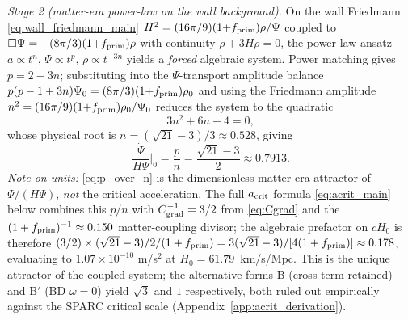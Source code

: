 \documentclass[aps,prd,twocolumn,nofootinbib,floatfix,superscriptaddress]{revtex4-2}
\begin{document}
\emph{Stage 2 (matter-era power-law on the wall background).} On the
wall Friedmann \eqref{eq:wall_friedmann_main}
$H^2 = (16\pi/9)(1{+}f_{\rm prim})\rho/\Psi$ coupled to
$\Box\Psi = -(8\pi/3)(1{+}f_{\rm prim})\rho$ with continuity
$\dot\rho + 3H\rho = 0$, the power-law ansatz
$a\propto t^n$, $\Psi\propto t^p$, $\rho\propto t^{-3n}$ yields a
\emph{forced} algebraic system. Power matching gives $p = 2-3n$;
substituting into the $\Psi$-transport amplitude balance
$p(p-1+3n)\Psi_0 = (8\pi/3)(1{+}f_{\rm prim})\rho_0$ and using the
Friedmann amplitude $n^2 = (16\pi/9)(1{+}f_{\rm prim})\rho_0/\Psi_0$
reduces the system to the quadratic
\begin{equation}
\label{eq:n_quadratic}
3n^2 + 6n - 4 = 0,
\end{equation}
whose physical root is $n = (\sqrt{21}-3)/3 \approx 0.528$, giving
\begin{equation}
\label{eq:p_over_n}
\frac{\dot\Psi}{H\Psi}\bigg|_0 = \frac{p}{n} = \frac{\sqrt{21}-3}{2}
\approx 0.7913.
\end{equation}
\emph{Note on units:} \eqref{eq:p_over_n} is the dimensionless
matter-era attractor of $\dot\Psi/(H\Psi)$, \emph{not} the
critical acceleration. The full $a_{\rm crit}$ formula
\eqref{eq:acrit_main} below combines this $p/n$ with $C_{\rm grad}^{-1}
= 3/2$ from \eqref{eq:Cgrad} and the $(1+f_{\rm prim})^{-1} \approx
0.150$ matter-coupling divisor; the algebraic prefactor on $cH_0$ is
therefore $(3/2)\times(\sqrt{21}-3)/2 / (1+f_{\rm prim}) =
3(\sqrt{21}-3)/[4(1+f_{\rm prim})] \approx 0.178$, evaluating to
$1.07\times 10^{-10}$ m/s$^2$ at $H_0 = 61.79$~km/s/Mpc.
This is the unique attractor of the coupled system; the alternative
forms B (cross-term retained) and B$'$ (BD $\omega=0$) yield
$\sqrt 3$ and $1$ respectively, both ruled out empirically against
the SPARC critical scale (Appendix~\ref{app:acrit_derivation}).
\end{document}
